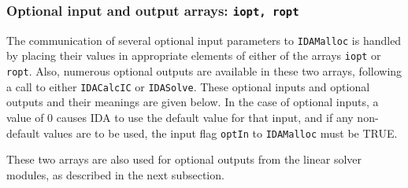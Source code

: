\documentclass[11pt]{article}
\begin{document}
\subsubsection{Optional input and output arrays: {\tt iopt, ropt}}

The communication of several optional input parameters to 
{\tt IDAMalloc} is handled by placing their values in appropriate
elements of either of the arrays {\tt iopt} or {\tt ropt}.  Also,
numerous optional outputs are available in these two arrays, following
a call to either {\tt IDACalcIC} or {\tt IDASolve}.  These optional
inputs and optional outputs and their meanings are given below.  
In the case of optional inputs, a value of 0 causes IDA to use the
default value for that input, and if any non-default values are to be
used, the input flag {\tt optIn} to {\tt IDAMalloc} must be TRUE.

These two arrays are also used for optional outputs from the linear
solver modules, as described in the next subsection.
\end{document}

